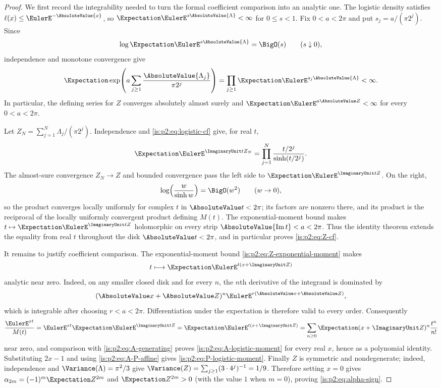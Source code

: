 \begin{proof}
We first record the integrability needed to turn the formal coefficient
comparison into an analytic one.  The logistic density satisfies
$\ell(x)\le\EulerE^{-\AbsoluteValue{x}}$, so
$\Expectation\EulerE^{s\AbsoluteValue{\Lambda}}<\infty$ for $0\le s<1$.
Fix $0<a<2\pi$ and put $s_j=a/(\pi2^j)$.  Since
\[
 \log\Expectation\EulerE^{s\AbsoluteValue{\Lambda}}=\BigO(s)
 \qquad(s\downarrow0),
\]
independence and monotone convergence give
\begin{equation}
 \Expectation\exp\!\left(
   a\sum_{j\ge1}\frac{\AbsoluteValue{\Lambda_j}}{\pi2^j}
  \right)
 =\prod_{j\ge1}\Expectation\EulerE^{s_j\AbsoluteValue{\Lambda}}
 <\infty.
 \label{is:p2:eq:Z-exponential-moment}
\end{equation}
In particular, the defining series for $Z$ converges absolutely almost surely
and $\Expectation\EulerE^{a\AbsoluteValue Z}<\infty$ for every
$0<a<2\pi$.

Let $Z_N=\sum_{j=1}^N\Lambda_j/(\pi2^j)$.  Independence and
\eqref{is:p2:eq:logistic-cf} give, for real $t$,
\[
 \Expectation\EulerE^{\ImaginaryUnit tZ_N}
 =\prod_{j=1}^{N}\frac{t/2^j}{\sinh(t/2^j)}.
\]
The almost-sure convergence $Z_N\to Z$ and bounded convergence pass the left
side to $\Expectation\EulerE^{\ImaginaryUnit tZ}$.  On the right,
\[
 \log\!\left(\frac{w}{\sinh w}\right)=\BigO(w^2)
 \qquad(w\to0),
\]
so the product converges locally uniformly for complex $t$ in
$\AbsoluteValue t<2\pi$; its factors are nonzero there, and its product is
the reciprocal of the locally uniformly convergent product defining $M(t)$.
The exponential-moment bound makes
$t\mapsto\Expectation\EulerE^{\ImaginaryUnit tZ}$ holomorphic on every strip
$\AbsoluteValue{\operatorname{Im}t}<a<2\pi$.  Thus the identity theorem
extends the equality from real $t$ throughout the disk
$\AbsoluteValue t<2\pi$, and in particular proves \eqref{is:p2:eq:Z-cf}.

It remains to justify coefficient comparison.  The exponential-moment bound
\eqref{is:p2:eq:Z-exponential-moment} makes
\[
 t\longmapsto \Expectation\EulerE^{t(x+\ImaginaryUnit Z)}
\]
analytic near zero.  Indeed, on any smaller closed disk and for every $n$,
the $n$th derivative of the integrand is dominated by
\[
 (\AbsoluteValue x+\AbsoluteValue Z)^n
 \EulerE^{r(\AbsoluteValue x+\AbsoluteValue Z)},
\]
which is integrable after choosing $r<a<2\pi$.  Differentiation under the
expectation is therefore valid to every order.  Consequently
\[
 \frac{\EulerE^{xt}}{M(t)}
 =\EulerE^{xt}\Expectation\EulerE^{\ImaginaryUnit tZ}
 =\Expectation\EulerE^{t(x+\ImaginaryUnit Z)}
 =\sum_{n\ge0}\Expectation(x+\ImaginaryUnit Z)^n\frac{t^n}{n!}
\]
near zero, and comparison with \eqref{is:p2:eq:A-generating} proves
\eqref{is:p2:eq:A-logistic-moment} for every real $x$, hence as a polynomial
identity.  Substituting $2x-1$ and using
\eqref{is:p2:eq:A-P-affine} gives \eqref{is:p2:eq:P-logistic-moment}.
Finally $Z$ is symmetric and nondegenerate; indeed, independence and
$\Variance(\Lambda)=\pi^2/3$ give
$\Variance(Z)=\sum_{j\ge1}(3\cdot4^j)^{-1}=1/9$.
Therefore setting $x=0$ gives
$\alpha_{2m}=(-1)^m\Expectation Z^{2m}$ and
$\Expectation Z^{2m}>0$ (with the value $1$ when $m=0$), proving
\eqref{is:p2:eq:alpha-sign}.
\end{proof}

